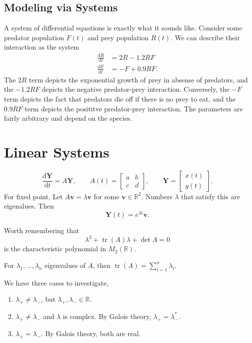\section{Modeling via Systems}
A system of differential equations is exactly what it sounds like. Consider some predator population $F(t)$ and prey population $R(t)$. We can describe their interaction as the system
\begin{align*}
	\frac{\mathrm{d}R}{\mathrm{d}t} &=2R-1.2RF\\
	\frac{\mathrm{d}F}{\mathrm{d}t} &=-F+0.9RF
.\end{align*}
The $2R$ term depicts the exponential growth of prey in absense of predators, and the $-1.2RF$ depicts the negative predator-prey interaction. Conversely, the $-F$ term depicts the fact that predators die off if there is no prey to eat, and the $0.9RF$ term depicts the posititve predator-prey interaction. The parameters are fairly arbitrary and depend on the species. 

\chapter{Linear Systems}

\begin{prev}
	\[
		\frac{\mathrm{d}\mathbf{Y}}{\mathrm{d}t} =A \mathbf{Y},\qquad A(t)=\begin{bmatrix} a&b \\ c&d \end{bmatrix} ,\qquad \mathbf{Y}=\begin{bmatrix} x(t) \\ y(t) \end{bmatrix} 
	.\]
	For fixed point,
	Let $A \mathbf{v}=\lambda \mathbf{v}$ for some $\mathbf{v}\in\mathbb{R}^2$. Numbers $\lambda $ that satisfy this are eigenalues. Then
	\[
		\mathbf{Y}(t)=e^{\lambda t}\mathbf{v}
	.\]
\end{prev}

Worth remembering that
\[
	\lambda ^2+\operatorname{tr}(A) \lambda +\det A=0
\]
is the characteristic polynomial in $M_2 (\mathbb{R})$.
\begin{remark}
	For $\lambda _1,\ldots,\lambda _n$ eigenvalues of  $A$, then $\operatorname{tr}(A) =\sum_{i=1} ^n\lambda _i$.
\end{remark}

We have three cases to investigate,
\begin{enumerate}
	\item $\lambda_+ \neq \lambda _-$, but $\lambda_+,\lambda _-\in\mathbb{R}$.
	\item $\lambda_+ \neq \lambda _-$ and $\lambda $ is complex. By Galois theory, $\lambda_+ = \lambda_-^*$.
	\item $\lambda _+ = \lambda _-$. By Galois theory, both are real.
\end{enumerate}

